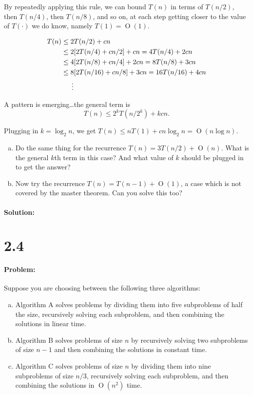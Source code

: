 \documentclass[12pt]{article}
\newcommand{\BigO}[1]{\ensuremath{\operatorname{O}\left(#1\right)}}
\begin{document}
By repeatedly applying this rule, we can bound $T(n)$ in terms of $T(n/2)$,
then $T(n/4)$, then $T(n/8)$, and so on, at each step getting closer to
the value of $T(\cdot)$ we do know,
namely $T(1) = \BigO{1}$.

\begin{align*}
T (n) &\leq 2T (n/2) + cn \\
&\leq 2[2T(n/4) + cn/2] + cn = 4T(n/4) + 2cn \\
&\leq 4[2T(n/8) + cn/4] + 2cn = 8T(n/8) + 3cn \\
&\leq 8[2T(n/16) + cn/8] + 3cn = 16T(n/16) + 4cn \\
&\indent \vdots
\end{align*}

A pattern is emerging\ldots the general term is 
\[T(n) \leq 2^kT(n/2^k) + kcn.\]

Plugging in $k = \log_2{n}$, we get $T(n) \leq nT(1) + cn\log_2{n} = \BigO{n\log{n}}.$

\begin{enumerate}[(a)]
\item Do the same thing for the recurrence $T(n) = 3T(n/2) + \BigO{n}$. What
is the general $k$th term
in this case? And what value of $k$ should be plugged in to get the
answer?

\item Now try the recurrence $T(n) = T( n −1 ) + \BigO{1}$, a case which is not
covered by the master theorem. Can you solve this too?
\end{enumerate}

\paragraph{Solution:}

\section*{2.4}
\paragraph{Problem:}
Suppose you are choosing between the following three algorithms:

\begin{enumerate}[(a)]
\item Algorithm A solves problems by dividing them into five subproblems
of half the size, recursively solving each subproblem, and then
combining the solutions in linear time.

\item Algorithm B solves problems of size $n$ by recursively solving two
subproblems of size $n−1$ and then combining the solutions in constant
time.

\item Algorithm C solves problems of size $n$ by dividing them into nine
subproblems of size $n/3$, recursively solving each subproblem, and then
combining the solutions in $\BigO{n^2}$ time.
\end{enumerate}
\end{document}
